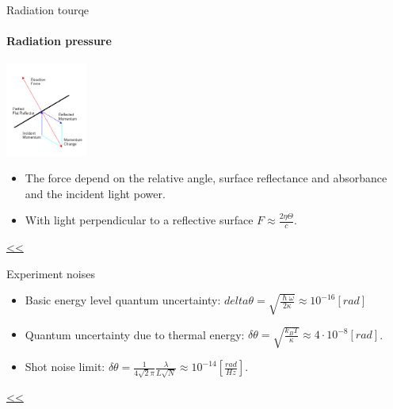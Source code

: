 \documentclass{beamer}
\begin{document}
\begin{frame}{\hypertarget{frame:Radiation tourqe 1}{Radiation tourqe}}
\framesubtitle{Radiation pressure}
	\begin{center}		
		\includegraphics[width=0.2\textwidth,keepaspectratio]{radiation.PNG}
    \end{center}

	
	\begin{itemize}		
		
		\item The force depend on the relative angle, surface reflectance and absorbance and the incident light power.
		\item With light perpendicular to a reflective surface $F  \approx\frac{2\eta\Theta}{{c}} $.
		
	\end{itemize}
	\hyperlink{frame:Radiation tourqe}{<<} 
\end{frame}

\begin{frame}{\hypertarget{frame:Experiment noises 1}{Experiment noises}}
	\begin{itemize}
		\framesubtitle{Fundamental limits}
		\item Basic energy level quantum uncertainty: $delta\theta= \sqrt{\frac{\hslash\omega}{2\kappa}} \approx 10^{-16} [rad]$
		\item Quantum uncertainty due to thermal energy: $\delta\theta = \sqrt{\frac{k_B T}{\kappa}} \approx 4\cdot 10^{-8} [rad]$.
		\item Shot noise limit: $\delta\theta = \frac{1}{4\sqrt{2}\pi}\frac{\lambda}{L\sqrt{N}} \approx 10^{-14} [\frac{rad}{Hz}]$.
		
	\end{itemize}
	\hyperlink{frame:Experiment noises}{<<}
\end{frame}
\end{document}
